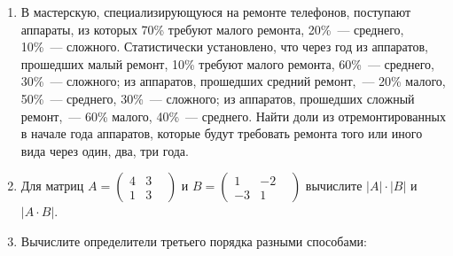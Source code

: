 \documentclass[a4paper,14pt]{extarticle}
\begin{document}
\begin{enumerate}
\item 
	В мастерскую, специализирующуюся на ремонте телефонов, поступают аппараты, из которых 70\% требуют малого ремонта, 20\%~--- среднего, 10\%~--- сложного.
	Статистически установлено, что через год из аппаратов, прошедших малый ремонт, 10\% требуют малого ремонта, 60\%~--- среднего, 30\%~--- сложного; из аппаратов, прошедших средний ремонт,~--- 20\% малого, 50\%~--- среднего, 30\%~--- сложного; из аппаратов, прошедших сложный ремонт,~--- 60\% малого, 40\%~--- среднего. Найти доли из отремонтированных в начале года аппаратов, которые будут требовать ремонта того или иного вида через один, два, три года.

\item Для матриц 
  $A=\begin{pmatrix}4&3&\\1&3\end{pmatrix}$ и 
  $B=\begin{pmatrix}1&-2&\\-3&1\end{pmatrix}$
  вычислите $|A|\cdot |B|$ и $|A\cdot B|$.
\item Вычислите определители третьего порядка разными способами:\\


\end{enumerate}
\end{document}
